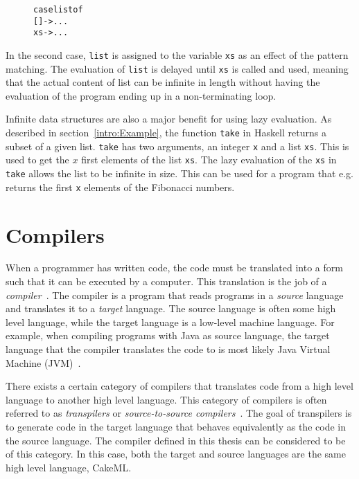 \begin{figure}[H]
\begin{alltt}
  case list of
    [] -> ...
    xs -> ...
\end{alltt}
\end{figure}

\noindent In the second case, \texttt{list} is assigned to the variable
\texttt{xs} as an effect of the pattern matching. The evaluation of
\texttt{list} is delayed until \texttt{xs} is called and used, meaning
that the actual content of list can be infinite in length without having the
evaluation of the program ending up in a non-terminating loop.

Infinite data structures are also a major benefit for using lazy evaluation.
As described in section~\ref{intro:Example}, the function \texttt{take}
in Haskell returns a subset of a given list. \texttt{take} has two arguments,
an integer \texttt{x} and a list \texttt{xs}. This is used to get the
$x$ first elements of the list \texttt{xs}. The lazy evaluation of the
\texttt{xs} in \texttt{take} allows the list to be infinite in size. This
can be used for a program that e.g. returns the first \texttt{x} elements of
the Fibonacci numbers.


\section{Compilers}
When a programmer has written code, the code must be translated into a form such
that it can be executed by a computer. This translation is the job of a
\textit{compiler}~\cite{DragonBook}. The compiler is a program that reads
programs in a \textit{source} language and translates it to a \textit{target}
language. The source language is often some high level language, while the
target language is a low-level machine language.
For example, when compiling programs with Java as source language, the target
language that the compiler translates the code to is most likely Java Virtual
Machine (JVM)~\cite{JavaJVM}.

There exists a certain category of compilers that translates code from a
high level language to another high level language. This category of compilers
is often referred to as \textit{transpilers} or
\textit{source-to-source compilers}~\cite{kulkarnitranspiler}.
The goal of transpilers is to generate code in the target language that behaves
equivalently as the code in the source language. The compiler defined in this %
thesis can be considered to be of this category. In this case, both the target
and source languages are the same high level language, CakeML.

